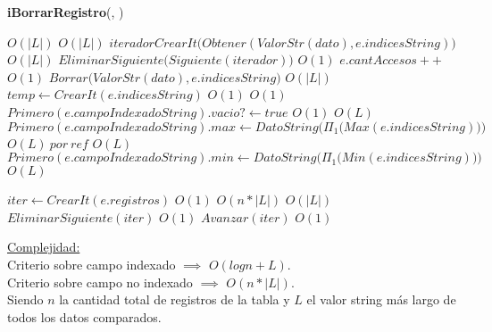 \begin{Algoritmos}
\begin{algorithm}[H]{\textbf{iBorrarRegistro}(, )}
\begin{algorithmic}
        \EndIf
        \Comment $O(|L|)$
           \Comment $O(|L|)$
          \State $iterador CrearIt\big(Obtener(ValorStr(dato), e.indicesString)\big)$ \Comment $O(|L|)$
          \State $EliminarSiguiente\big(Siguiente(iterador)\big)$ \Comment $O(1)$
          \State $e.cantAccesos++$                                \Comment $O(1)$
          \State $Borrar\big(ValorStr(dato), e.indicesString\big)$ \Comment $O(|L|)$
          \State $temp \gets CrearIt(e.indicesString)$ \Comment $O(1)$
           \Comment $O(1)$
            \State $Primero(e.campoIndexadoString).vacio? \gets true$ \Comment $O(1)$
          \Else
             \Comment $O(L)$
                \State $Primero(e.campoIndexadoString).max \gets DatoString\big(\Pi_1\big(Max(e.indicesString)\big)\big)$\\ \Comment $O(L) \ por\ ref$
            \EndIf
             \Comment $O(L)$
                \State $Primero(e.campoIndexadoString).min \gets DatoString\big(\Pi_1\big(Min(e.indicesString)\big)\big)$ \Comment $O(L)$
            \EndIf
          \EndIf



        \EndIf
      \Else

  \end{algorithmic}
\end{algorithm}

\clearpage

\begin{algorithm}
  \begin{algorithmic}


        \State $iter \gets CrearIt(e.registros)$                  \Comment $O(1)$
                                      \Comment $O(n * |L|)$
             \Comment $O(|L|)$
            \State $EliminarSiguiente(iter)$                      \Comment $O(1)$
          \EndIf
          \State $Avanzar(iter)$                                  \Comment $O(1)$
        \EndWhile
      \EndIf



      \medskip
      \Statex \underline{Complejidad:} {\\
\quad\quad Criterio sobre campo indexado $\implies$ $O(log n + L)$. \\
\quad\quad Criterio sobre campo no indexado $\implies$ $O(n*|L|)$. \\
\quad\quad Siendo $n$ la cantidad total de registros de la tabla y $L$ el valor string más largo de todos los datos comparados.}


\end{algorithmic}
\end{algorithm}
\end{Algoritmos}
